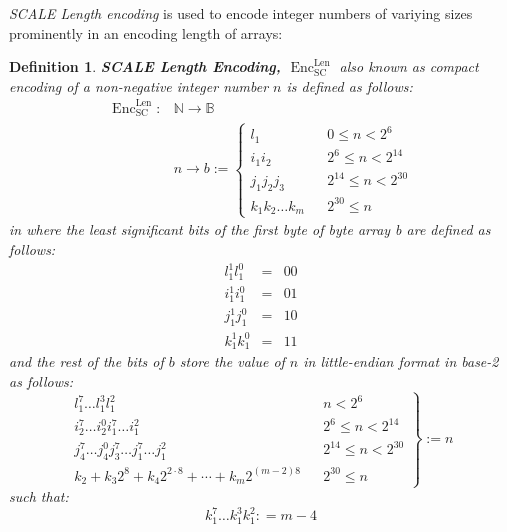 \documentclass{book}
\newcommand{\assign}{:=}
\newcommand{\cdummy}{\cdot}
\newcommand{\nosymbol}{}
\newcommand{\tmem}[1]{{\em #1\/}}
\newcommand{\tmop}[1]{\ensuremath{\operatorname{#1}}}
\newcommand{\tmstrong}[1]{\textbf{#1}}
\newcommand{\tmtextbf}[1]{{\bfseries{#1}}}
\newcommand{\tmtextit}[1]{{\itshape{#1}}}
\newtheorem{definition}{Definition}
\providecommand{\cdummy}{{\cdot}}
\providecommand{\nosymbol}{}
\providecommand{\tmem}[1]{\tmtextit{#1}}
\providecommand{\tmop}[1]{\ensuremath{\mathrm{#1}}}
\providecommand{\tmstrong}[1]{\tmtextbf{#1}}
\providecommand{\tmtextbf}[1]{\tmtextbf{#1}}
\providecommand{\tmtextit}[1]{\tmtextit{#1}}
\newtheorem{definition}{Definition}
\begin{document}
{\tmem{SCALE Length encoding}} is used to encode integer numbers of variying
sizes prominently in an encoding length of arrays:

\begin{definition}
  \label{defn-sc-len-encoding}{\tmstrong{SCALE Length Encoding,
  $\tmop{Enc}^{\tmop{Len}}_{\tmop{SC}}$}} also known as compact encoding of a
  non-negative integer number $n$ is defined as follows:
  \[ \begin{array}{ll}
       \tmop{Enc}^{\tmop{Len}}_{\tmop{SC}} : & \mathbb{N} \rightarrow
       \mathbb{B}\\
       & n \rightarrow b \assign \left\{ \begin{array}{lll}
         l^{\nosymbol}_1 &  & 0 \leqslant n < 2^6\\
         i^{\nosymbol}_1 i^{\nosymbol}_2 &  & 2^6 \leqslant n < 2^{14}\\
         j^{\nosymbol}_1 j^{\nosymbol}_2 j_3 &  & 2^{14} \leqslant n <
         2^{30}\\
         k_1^{\nosymbol} k_2^{\nosymbol} \ldots k_m^{\nosymbol}  &  & 2^{30}
         \leqslant n
       \end{array} \right.
     \end{array} \]
  in where the least significant bits of the first byte of byte array b are
  defined as follows:
  \[ \begin{array}{lcc}
       l^1_1 l_1^0 & = & 00\\
       i^1_1 i_1^0 & = & 01\\
       j^1_1 j_1^0 & = & 10\\
       k^1_1 k_1^0 & = & 11
     \end{array} \]
  and the rest of the bits of $b$ store the value of $n$ in little-endian
  format in base-2 as follows:
  \[ \left. \begin{array}{lll}
       l^7_1 \ldots l^3_1 l^2_1 &  & n < 2^6\\
       i_2^7 \ldots i_2^0 i_1^7 \ldots i^2_1^{\nosymbol} &  & 2^6 \leqslant n
       < 2^{14}\\
       j_4^7 \ldots j_4^0 j_3^7 \ldots j_1^7 \ldots j^2_1 &  & 2^{14}
       \leqslant n < 2^{30}\\
       k_2 + k_3 2^8 + k_4 2^{2 \cdummy 8} + \cdots + k_m 2^{(m - 2) 8} &  &
       2^{30} \leqslant n
     \end{array} \right\} \assign n \]
  such that:
  \[ k^7_1 \ldots k^3_1 k^2_1 : = m - 4 \]
\end{definition}
\end{document}

